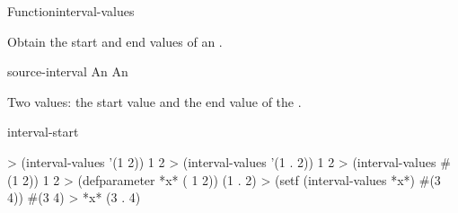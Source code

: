 \documentclass[10pt,twoside,english,pdftex]{article}
\begin{document}
\begin{functiondoc}{Function}{interval-values}%
  { 
    \returns{} }
%
%
%
%
%
%

\fnsyntax

\fnpurpose Obtain the start and end values of an .

\fnsetf
{}

\fnpackage {}

\fnmodule {}

\fnargs
\begin{args}{source-interval}
\arg[interval] An 
 An 
\end{args}

\fnreturns Two values: the start value and the end value of the .

\begin{alsos}{interval-start}
\end{alsos}

\fnexamples
%
%
\W\supp
\begin{example}
> (interval-values '(1 2))
1
2
> (interval-values '(1 . 2))
1
2
> (interval-values #(1  2))
1
2\goodpagebreak
> (defparameter *x* ( 1 2))
(1 . 2)
> (setf (interval-values *x*) #(3 4))
#(3 4)
> *x*
(3 . 4)
\end{example}

\end{functiondoc}

\end{document}

